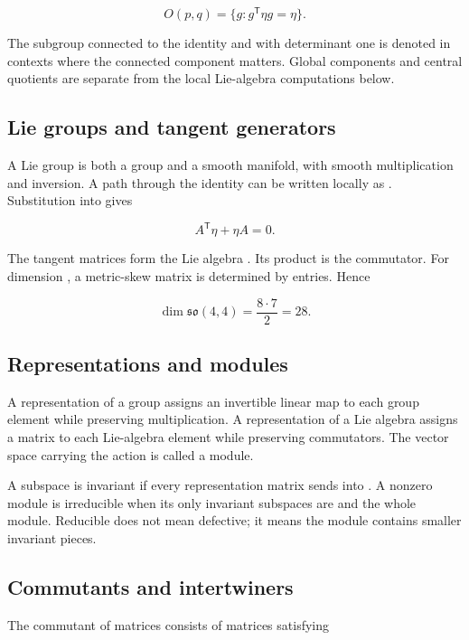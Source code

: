 \documentclass[11pt]{article}
\begin{document}
\[
O(p,q)=\{g:g^{\mathsf T}\eta g=\eta\}.
\]

The subgroup connected to the identity and with determinant one is denoted \texttt{} in contexts where the connected component matters. Global components and central quotients are separate from the local Lie-algebra computations below.

\subsection{Lie groups and tangent generators}

A Lie group is both a group and a smooth manifold, with smooth multiplication and inversion. A path through the identity can be written locally as \texttt{}. Substitution into \texttt{} gives

\[
A^{\mathsf T}\eta+\eta A=0.
\]

The tangent matrices form the Lie algebra \texttt{}. Its product is the commutator. For dimension \texttt{}, a metric-skew matrix is determined by \texttt{} entries. Hence

\[
\dim\mathfrak{so}(4,4)=\frac{8\cdot7}{2}=28.
\]

\subsection{Representations and modules}

A representation of a group assigns an invertible linear map to each group element while preserving multiplication. A representation of a Lie algebra assigns a matrix to each Lie-algebra element while preserving commutators. The vector space carrying the action is called a module.

A subspace \texttt{} is invariant if every representation matrix sends \texttt{} into \texttt{}. A nonzero module is irreducible when its only invariant subspaces are \texttt{} and the whole module. Reducible does not mean defective; it means the module contains smaller invariant pieces.

\subsection{Commutants and intertwiners}

The commutant of matrices \texttt{} consists of matrices \texttt{} satisfying
\end{document}
